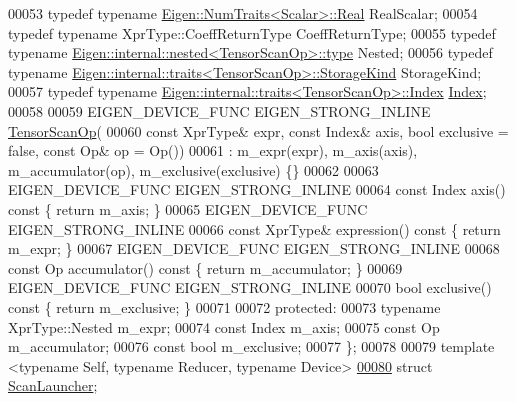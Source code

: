 \begin{DoxyCode}
00053   \textcolor{keyword}{typedef} \textcolor{keyword}{typename} \hyperlink{group___sparse_core___module}{Eigen::NumTraits<Scalar>::Real} RealScalar;
00054   \textcolor{keyword}{typedef} \textcolor{keyword}{typename} XprType::CoeffReturnType CoeffReturnType;
00055   \textcolor{keyword}{typedef} \textcolor{keyword}{typename} \hyperlink{class_eigen_1_1internal_1_1_tensor_lazy_evaluator_writable}{Eigen::internal::nested<TensorScanOp>::type} 
      Nested;
00056   \textcolor{keyword}{typedef} \textcolor{keyword}{typename} \hyperlink{struct_eigen_1_1internal_1_1traits}{Eigen::internal::traits<TensorScanOp>::StorageKind}
       StorageKind;
00057   \textcolor{keyword}{typedef} \textcolor{keyword}{typename} \hyperlink{struct_eigen_1_1internal_1_1traits}{Eigen::internal::traits<TensorScanOp>::Index}
       \hyperlink{namespace_eigen_a62e77e0933482dafde8fe197d9a2cfde}{Index};
00058 
00059   EIGEN\_DEVICE\_FUNC EIGEN\_STRONG\_INLINE \hyperlink{class_eigen_1_1_tensor_scan_op}{TensorScanOp}(
00060       \textcolor{keyword}{const} XprType& expr, \textcolor{keyword}{const} Index& axis, \textcolor{keywordtype}{bool} exclusive = \textcolor{keyword}{false}, \textcolor{keyword}{const} Op& op = Op())
00061       : m\_expr(expr), m\_axis(axis), m\_accumulator(op), m\_exclusive(exclusive) \{\}
00062 
00063   EIGEN\_DEVICE\_FUNC EIGEN\_STRONG\_INLINE
00064   \textcolor{keyword}{const} Index axis()\textcolor{keyword}{ const }\{ \textcolor{keywordflow}{return} m\_axis; \}
00065   EIGEN\_DEVICE\_FUNC EIGEN\_STRONG\_INLINE
00066   \textcolor{keyword}{const} XprType& expression()\textcolor{keyword}{ const }\{ \textcolor{keywordflow}{return} m\_expr; \}
00067   EIGEN\_DEVICE\_FUNC EIGEN\_STRONG\_INLINE
00068   \textcolor{keyword}{const} Op accumulator()\textcolor{keyword}{ const }\{ \textcolor{keywordflow}{return} m\_accumulator; \}
00069   EIGEN\_DEVICE\_FUNC EIGEN\_STRONG\_INLINE
00070   \textcolor{keywordtype}{bool} exclusive()\textcolor{keyword}{ const }\{ \textcolor{keywordflow}{return} m\_exclusive; \}
00071 
00072 \textcolor{keyword}{protected}:
00073   \textcolor{keyword}{typename} XprType::Nested m\_expr;
00074   \textcolor{keyword}{const} Index m\_axis;
00075   \textcolor{keyword}{const} Op m\_accumulator;
00076   \textcolor{keyword}{const} \textcolor{keywordtype}{bool} m\_exclusive;
00077 \};
00078 
00079 \textcolor{keyword}{template} <\textcolor{keyword}{typename} Self, \textcolor{keyword}{typename} Reducer, \textcolor{keyword}{typename} Device>
\hyperlink{struct_eigen_1_1_scan_launcher}{00080} \textcolor{keyword}{struct }\hyperlink{struct_eigen_1_1_scan_launcher}{ScanLauncher};

\end{DoxyCode}
